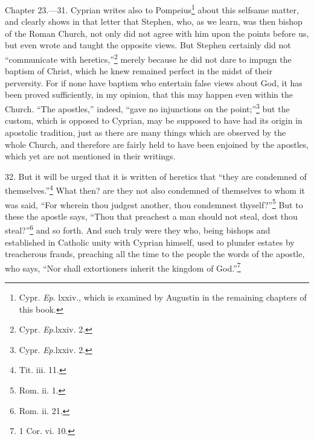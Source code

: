
Chapter 23.—31. Cyprian writes also to Pompeius\footnote{\par  Cypr. \emph{Ep}. lxxiv., which is examined by Augustin in the remaining chapters of this book.} about this selfsame matter, and clearly shows in that letter that Stephen, who, as we learn, was then bishop of the Roman Church, not only did not agree with him upon the points before us, but even wrote and taught the opposite views. But Stephen certainly did not ``communicate with heretics,''\footnote{\par  Cypr. \emph{Ep}.lxxiv. 2.} merely because he did not dare to impugn the baptism of Christ, which he knew remained perfect in the midst of their perversity. For if none have baptism who entertain false views about God, it has been proved sufficiently, in my opinion, that this may happen even within the Church. ``The apostles,'' indeed, ``gave no injunctions on the point;''\footnote{\par  Cypr. \emph{Ep}.lxxiv. 2.} but the custom, which is opposed to Cyprian, may be supposed to have had its origin in apostolic tradition, just as there are many things which are observed by the whole Church, and therefore are fairly held to have been enjoined by the apostles, which yet are not mentioned in their writings.

32. But it will be urged that it is written of heretics that ``they are condemned of themselves.''\footnote{\par  Tit. iii. 11.} What then? are they not also condemned of themselves to whom it was said, ``For wherein thou judgest another, thou condemnest thyself?''\footnote{\par  Rom. ii. 1.} But to these the apostle says, ``Thou that preachest a man should not steal, dost thou steal?''\footnote{\par  Rom. ii. 21.} and so forth. And such truly were they who, being bishops and established in Catholic unity with Cyprian himself, used to plunder estates by treacherous frauds, preaching all the time to the people the words of the apostle, who says, ``Nor shall extortioners inherit the kingdom of God.''\footnote{\par  1 Cor. vi. 10.}

